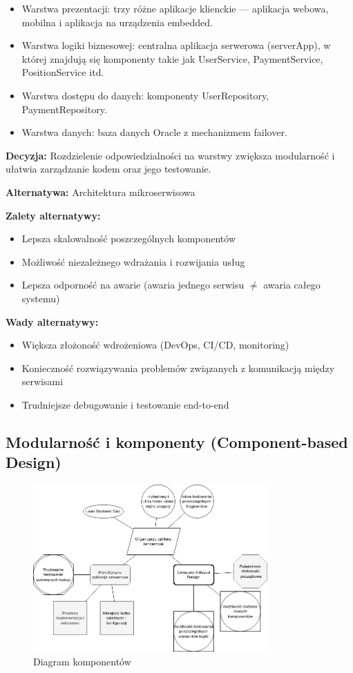 \documentclass[12pt]{article}
\begin{document}
\begin{itemize}
\item Warstwa prezentacji: trzy różne aplikacje klienckie — aplikacja webowa, mobilna i aplikacja na urządzenia embedded.
\item Warstwa logiki biznesowej: centralna aplikacja serwerowa (serverApp), w której znajdują się komponenty takie jak UserService, PaymentService, PositionService itd.
\item Warstwa dostępu do danych: komponenty UserRepository, PaymentRepository.
\item Warstwa danych: baza danych Oracle z mechanizmem failover.
\end{itemize}

\textbf{Decyzja:} Rozdzielenie odpowiedzialności na warstwy zwiększa modularność i ułatwia zarządzanie kodem oraz jego testowanie.

\textbf{Alternatywa:} Architektura mikroserwisowa

\textbf{Zalety alternatywy:}
\begin{itemize}
\item Lepsza skalowalność poszczególnych komponentów
\item Możliwość niezależnego wdrażania i rozwijania usług
\item Lepsza odporność na awarie (awaria jednego serwisu $\neq$ awaria całego systemu)
\end{itemize}

\textbf{Wady alternatywy:}
\begin{itemize}
\item Większa złożoność wdrożeniowa (DevOps, CI/CD, monitoring)
\item Konieczność rozwiązywania problemów związanych z komunikacją między serwisami
\item Trudniejsze debugowanie i testowanie end-to-end
\end{itemize}

\subsection{Modularność i komponenty (Component-based Design)}
\begin{figure}[H]
\centering
\includegraphics[width=0.8\textwidth]{organizacja_aplikacji_serwerowej.png}
\caption{Diagram komponentów}
\label{fig:components}
\end{figure}
\end{document}
